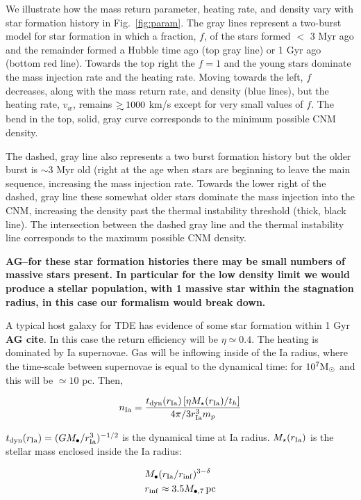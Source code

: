 \documentclass[usenatbib,fleqn]{mnras}
\newcommand\gsim{\mathrel{\rlap{\lower4pt\hbox{\hskip1pt$\sim$}}
    \raise1pt\hbox{$>$}}}
\newcommand{\Mbh}[1][]{M_{\bullet#1}}
\newcommand{\Msun}{{\rm M_\odot}}
\begin{document}
We illustrate how the mass return parameter, heating rate, and
density vary with star formation history in Fig.~\ref{fig:param}. The
gray lines represent a two-burst model for star formation in which a
fraction, $f$, of the stars formed $<$ 3 Myr ago and the remainder
formed a Hubble time ago (top gray line) or 1 Gyr ago (bottom red
line).  Towards the top right the $f=1$ and the young stars dominate
the mass injection rate and the heating rate.  Moving towards the
left, $f$ decreases, along with the mass return rate, and density
(blue lines), but the heating rate, $v_w$, remains $\gsim 1000$ km/s
except for very small values of $f$. The bend in the top, solid, gray curve
corresponds to the minimum possible CNM density.

The dashed, gray line also represents a two burst formation history
but the older burst is $\sim 3$ Myr old (right at the age when stars
are beginning to leave the main sequence, increasing the mass
injection rate. Towards the lower right of the dashed, gray line these
somewhat older stars dominate the mass injection into the CNM,
increasing the density past the thermal instability threshold (thick,
black line). The intersection between the dashed gray line and the
thermal instability line corresponds to the maximum possible CNM
density.

{\bf AG--for these star formation histories there may be small numbers
of massive stars present. In particular for the low density limit we
would produce a stellar population, with 1 massive star within the
stagnation radius, in this case our formalism would break down.}

A typical host galaxy for TDE has evidence of some star formation
within 1 Gyr {\bf AG cite}. In this case the return efficiency will be
$\eta\simeq 0.4$. The heating is dominated by Ia supernovae.  Gas will
be inflowing inside of the Ia radius, where the time-scale between
supernovae is equal to the dynamical time: for $10^7 \Msun$ and this
will be $\simeq 10$ pc. Then,

\begin{equation}
n_{\rm Ia}=\frac{t_{\rm dyn}(r_{\rm Ia}) \left[\eta M_{\star} (r_{\rm
    Ia})/t_h\right]}{4 \pi/3 r_{\rm Ia}^3 m_p}
\label{eq:nIa}
\end{equation}

$t_{\rm dyn}(r_{\rm Ia})=(G \Mbh/r_{\rm Ia}^3)^{-1/2}$ is the
dynamical time at Ia radius. $M_{\star}(r_{\rm Ia})$ is the stellar
mass enclosed inside the Ia radius:

\begin{align}
&\Mbh (r_{\rm Ia}/r_{\rm inf})^{3-\delta}\\
&r_{\inf}\approx 3.5 \Mbh[,7] \, {\rm pc}
\end{align}
\end{document}
